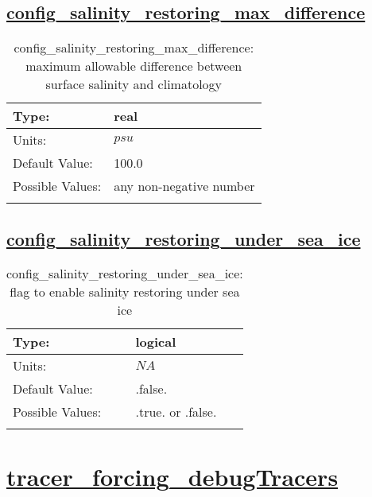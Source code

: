 \subsection[config\_salinity\_restoring\_max\_difference]{\hyperref[sec:nm_tab_tracer_forcing_activeTracers]{config\_salinity\_restoring\_max\_difference}}
\label{subsec:nm_sec_config_salinity_restoring_max_difference}
\begin{center}
\begin{longtable}{| p{2.0in} || p{4.0in} |}
    \hline
    Type: & real \\
    \hline
    Units: & $psu$ \\
    \hline
    Default Value: & 100.0 \\
    \hline
    Possible Values: & any non-negative number \\
    \hline
    \caption{config\_salinity\_restoring\_max\_difference: maximum allowable difference between surface salinity and climatology}
\end{longtable}
\end{center}
\subsection[config\_salinity\_restoring\_under\_sea\_ice]{\hyperref[sec:nm_tab_tracer_forcing_activeTracers]{config\_salinity\_restoring\_under\_sea\_ice}}
\label{subsec:nm_sec_config_salinity_restoring_under_sea_ice}
\begin{center}
\begin{longtable}{| p{2.0in} || p{4.0in} |}
    \hline
    Type: & logical \\
    \hline
    Units: & $NA$ \\
    \hline
    Default Value: & .false. \\
    \hline
    Possible Values: & .true. or .false. \\
    \hline
    \caption{config\_salinity\_restoring\_under\_sea\_ice: flag to enable salinity restoring under sea ice}
\end{longtable}
\end{center}
\section[tracer\_forcing\_debugTracers]{\hyperref[sec:nm_tab_tracer_forcing_debugTracers]{tracer\_forcing\_debugTracers}}
\label{sec:nm_sec_tracer_forcing_debugTracers}
